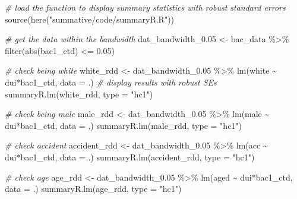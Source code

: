 \documentclass[
  11pt,
]{article}
\newenvironment{Shaded}{\begin{snugshade}}{\end{snugshade}}
\newcommand{\AttributeTok}[1]{\textcolor[rgb]{0.77,0.63,0.00}{#1}}
\newcommand{\CommentTok}[1]{\textcolor[rgb]{0.56,0.35,0.01}{\textit{#1}}}
\newcommand{\FloatTok}[1]{\textcolor[rgb]{0.00,0.00,0.81}{#1}}
\newcommand{\FunctionTok}[1]{\textcolor[rgb]{0.00,0.00,0.00}{#1}}
\newcommand{\NormalTok}[1]{#1}
\newcommand{\OtherTok}[1]{\textcolor[rgb]{0.56,0.35,0.01}{#1}}
\newcommand{\SpecialCharTok}[1]{\textcolor[rgb]{0.00,0.00,0.00}{#1}}
\newcommand{\StringTok}[1]{\textcolor[rgb]{0.31,0.60,0.02}{#1}}
\begin{document}
\begin{Shaded}
\begin{Highlighting}[]
\CommentTok{\# load the function to display summary statistics with robust standard errors}
\FunctionTok{source}\NormalTok{(}\FunctionTok{here}\NormalTok{(}\StringTok{"summative/code/summaryR.R"}\NormalTok{))}

\CommentTok{\# get the data within the bandwidth}
\NormalTok{dat\_bandwidth\_0}\FloatTok{.05} \OtherTok{\textless{}{-}}\NormalTok{ bac\_data }\SpecialCharTok{\%\textgreater{}\%} \FunctionTok{filter}\NormalTok{(}\FunctionTok{abs}\NormalTok{(bac1\_ctd) }\SpecialCharTok{\textless{}=} \FloatTok{0.05}\NormalTok{)}

\CommentTok{\# check being white}
\NormalTok{white\_rdd }\OtherTok{\textless{}{-}}\NormalTok{ dat\_bandwidth\_0}\FloatTok{.05} \SpecialCharTok{\%\textgreater{}\%} \FunctionTok{lm}\NormalTok{(white }\SpecialCharTok{\textasciitilde{}}\NormalTok{ dui}\SpecialCharTok{*}\NormalTok{bac1\_ctd, }\AttributeTok{data =}\NormalTok{ .)}
\CommentTok{\# display results with robust SEs}
\FunctionTok{summaryR.lm}\NormalTok{(white\_rdd, }\AttributeTok{type =} \StringTok{"hc1"}\NormalTok{)}

\CommentTok{\# check being male}
\NormalTok{male\_rdd }\OtherTok{\textless{}{-}}\NormalTok{ dat\_bandwidth\_0}\FloatTok{.05} \SpecialCharTok{\%\textgreater{}\%} \FunctionTok{lm}\NormalTok{(male }\SpecialCharTok{\textasciitilde{}}\NormalTok{ dui}\SpecialCharTok{*}\NormalTok{bac1\_ctd, }\AttributeTok{data =}\NormalTok{ .)}
\FunctionTok{summaryR.lm}\NormalTok{(male\_rdd, }\AttributeTok{type =} \StringTok{"hc1"}\NormalTok{)}

\CommentTok{\# check accident}
\NormalTok{accident\_rdd }\OtherTok{\textless{}{-}}\NormalTok{ dat\_bandwidth\_0}\FloatTok{.05} \SpecialCharTok{\%\textgreater{}\%} \FunctionTok{lm}\NormalTok{(acc }\SpecialCharTok{\textasciitilde{}}\NormalTok{ dui}\SpecialCharTok{*}\NormalTok{bac1\_ctd, }\AttributeTok{data =}\NormalTok{ .)}
\FunctionTok{summaryR.lm}\NormalTok{(accident\_rdd, }\AttributeTok{type =} \StringTok{"hc1"}\NormalTok{)}

\CommentTok{\# check age}
\NormalTok{age\_rdd }\OtherTok{\textless{}{-}}\NormalTok{ dat\_bandwidth\_0}\FloatTok{.05} \SpecialCharTok{\%\textgreater{}\%} \FunctionTok{lm}\NormalTok{(aged }\SpecialCharTok{\textasciitilde{}}\NormalTok{ dui}\SpecialCharTok{*}\NormalTok{bac1\_ctd, }\AttributeTok{data =}\NormalTok{ .)}
\FunctionTok{summaryR.lm}\NormalTok{(age\_rdd, }\AttributeTok{type =} \StringTok{"hc1"}\NormalTok{)}
\end{Highlighting}
\end{Shaded}
\end{document}
